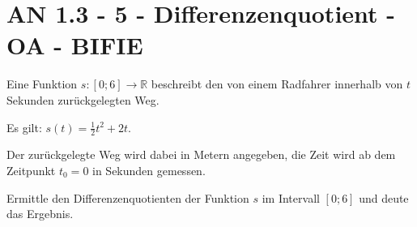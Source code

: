 \section{AN 1.3 - 5 - Differenzenquotient - OA - BIFIE}


\begin{beispiel}[AN 1.3]{1} %
Eine Funktion $s:[0;6]\rightarrow \mathbb{R}$ beschreibt den von einem Radfahrer innerhalb von $t$ Sekunden zurückgelegten Weg.

Es gilt: $s(t)=\frac{1}{2}t^2+2t$.

Der zurückgelegte Weg wird dabei in Metern angegeben, die Zeit wird ab dem Zeitpunkt $t_0=0$ in Sekunden gemessen.

Ermittle den Differenzenquotienten der Funktion $s$ im Intervall $[0; 6]$ und deute das Ergebnis.

\end{beispiel}